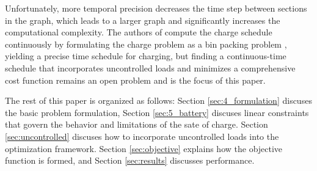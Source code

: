 \par Unfortunately, more temporal precision decreases the time step between sections in the graph, which leads to a larger graph and significantly increases the computational complexity. The authors of \cite{brown_position_nodate} compute the charge schedule continuously by formulating the charge problem as a bin packing problem \cite{Ma_Mixed-integer_2017}, yielding a precise time schedule for charging, but finding a continuous-time schedule that incorporates uncontrolled loads and minimizes a comprehensive cost function remains an open problem and is the focus of this paper. 
\par The rest of this paper is organized as follows: Section \ref{sec:4_formulation} discuses the basic problem formulation, Section \ref{sec:5_battery} discuses linear constraints that govern the behavior and limitations of the sate of charge. Section \ref{sec:uncontrolled} discuses how to incorporate uncontrolled loads into the optimization framework. Section \ref{sec:objective} explains how the objective function is formed, and Section \ref{sec:results} discusses performance.
